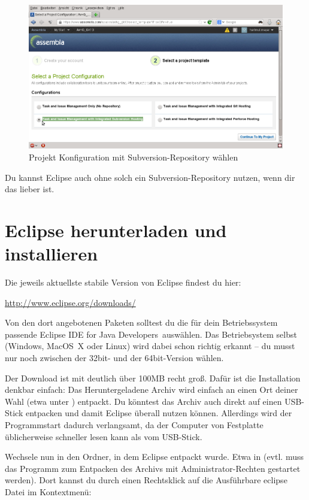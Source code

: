 \begin{figure}[h]
  \centering
   \includegraphics[width=1.0\textwidth]{./inf/SEKII/01_Vorbereitung/Assembla_Project_Configuration.png}
   \caption{Projekt Konfiguration mit Subversion-Repository wählen}
   \label{fig:assembla-project-configuration}
\end{figure}

Du kannst Eclipse auch ohne solch ein Subversion-Repository nutzen, wenn dir
das lieber ist.

\afterpage{\clearpage}

\section{Eclipse herunterladen und installieren}

Die jeweils aktuellste stabile Version von Eclipse findest du hier:	

\url{http://www.eclipse.org/downloads/}

Von den dort angebotenen Paketen solltest du die für dein Betriebssystem
passende \glqq Eclipse IDE for Java Developers\grqq\ auswählen. Das
Betriebsystem selbst (Windows, \mbox{MacOS X} oder Linux) wird dabei schon
richtig erkannt -- du musst nur noch zwischen der 32bit- und der 64bit-Version
wählen.

Der Download ist mit deutlich über 100MB recht groß. Dafür ist die Installation
denkbar einfach: Das Heruntergeladene Archiv wird einfach an einen Ort deiner
Wahl (etwa unter ) entpackt. Du könntest das
Archiv auch direkt auf einen USB-Stick entpacken und damit Eclipse überall
nutzen können. Allerdings wird der Programmstart dadurch verlangsamt, da der
Computer von Festplatte üblicherweise schneller lesen kann als vom USB-Stick.

Wechsele nun in den Ordner, in dem Eclipse entpackt wurde. Etwa in
 (evtl. muss das
Programm zum Entpacken des Archivs mit Administrator-Rechten gestartet werden).
Dort kannst du durch einen Rechtsklick auf die Ausführbare eclipse Datei im
Kontextmenü:

